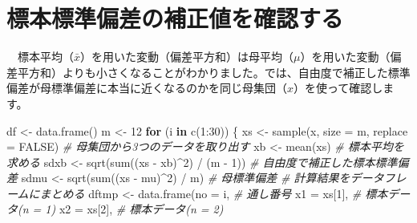 \documentclass[]{tufte-handout}
\newenvironment{Shaded}{}{}
\newcommand{\AttributeTok}[1]{\textcolor[rgb]{0.49,0.56,0.16}{#1}}
\newcommand{\CommentTok}[1]{\textcolor[rgb]{0.38,0.63,0.69}{\textit{#1}}}
\newcommand{\ConstantTok}[1]{\textcolor[rgb]{0.53,0.00,0.00}{#1}}
\newcommand{\ControlFlowTok}[1]{\textcolor[rgb]{0.00,0.44,0.13}{\textbf{#1}}}
\newcommand{\DecValTok}[1]{\textcolor[rgb]{0.25,0.63,0.44}{#1}}
\newcommand{\FunctionTok}[1]{\textcolor[rgb]{0.02,0.16,0.49}{#1}}
\newcommand{\NormalTok}[1]{#1}
\newcommand{\OtherTok}[1]{\textcolor[rgb]{0.00,0.44,0.13}{#1}}
\newcommand{\SpecialCharTok}[1]{\textcolor[rgb]{0.25,0.44,0.63}{#1}}
\begin{document}
\newpage

\hypertarget{ux6a19ux672cux6a19ux6e96ux504fux5deeux306eux88dcux6b63ux5024ux3092ux78baux8a8dux3059ux308b}{%
\section{\texorpdfstring{\textbf{標本標準偏差の補正値を確認する}}{標本標準偏差の補正値を確認する}}\label{ux6a19ux672cux6a19ux6e96ux504fux5deeux306eux88dcux6b63ux5024ux3092ux78baux8a8dux3059ux308b}}

　標本平均（\(\bar{x}\)）を用いた変動（偏差平方和）は母平均（\(\mu\)）を用いた変動（偏差平方和）よりも小さくなることがわかりました。では、自由度で補正した標準偏差が母標準偏差に本当に近くなるのかを同じ母集団（\(x\)）を使って確認します。

\begin{Shaded}
\begin{Highlighting}[numbers=left,,]
\NormalTok{df }\OtherTok{\textless{}{-}} \FunctionTok{data.frame}\NormalTok{()}
\NormalTok{m }\OtherTok{\textless{}{-}} \DecValTok{12}
\ControlFlowTok{for}\NormalTok{ (i }\ControlFlowTok{in} \FunctionTok{c}\NormalTok{(}\DecValTok{1}\SpecialCharTok{:}\DecValTok{30}\NormalTok{)) \{}
\NormalTok{  xs }\OtherTok{\textless{}{-}} \FunctionTok{sample}\NormalTok{(x, }\AttributeTok{size =}\NormalTok{ m, }\AttributeTok{replace =} \ConstantTok{FALSE}\NormalTok{)  }\CommentTok{\# 母集団から3つのデータを取り出す}
\NormalTok{  xb }\OtherTok{\textless{}{-}} \FunctionTok{mean}\NormalTok{(xs)                              }\CommentTok{\# 標本平均を求める}
\NormalTok{  sdxb }\OtherTok{\textless{}{-}} \FunctionTok{sqrt}\NormalTok{(}\FunctionTok{sum}\NormalTok{((xs }\SpecialCharTok{{-}}\NormalTok{ xb)}\SpecialCharTok{\^{}}\DecValTok{2}\NormalTok{) }\SpecialCharTok{/}\NormalTok{ (m }\SpecialCharTok{{-}} \DecValTok{1}\NormalTok{))    }\CommentTok{\# 自由度で補正した標本標準偏差}
\NormalTok{  sdmu }\OtherTok{\textless{}{-}} \FunctionTok{sqrt}\NormalTok{(}\FunctionTok{sum}\NormalTok{((xs }\SpecialCharTok{{-}}\NormalTok{ mu)}\SpecialCharTok{\^{}}\DecValTok{2}\NormalTok{) }\SpecialCharTok{/}\NormalTok{ m)          }\CommentTok{\# 母標準偏差}
  \CommentTok{\# 計算結果をデータフレームにまとめる}
\NormalTok{  dftmp }\OtherTok{\textless{}{-}} \FunctionTok{data.frame}\NormalTok{(}\AttributeTok{no =}\NormalTok{ i,             }\CommentTok{\# 通し番号}
                      \AttributeTok{x1 =}\NormalTok{ xs[}\DecValTok{1}\NormalTok{],         }\CommentTok{\# 標本データ(n = 1)}
                      \AttributeTok{x2 =}\NormalTok{ xs[}\DecValTok{2}\NormalTok{],         }\CommentTok{\# 標本データ(n = 2)}

\end{Highlighting}
\end{Shaded}
\end{document}
